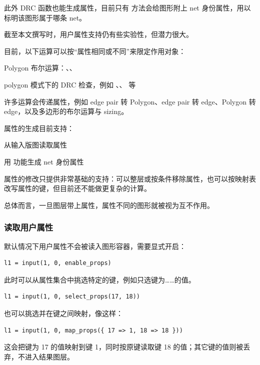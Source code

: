 此外 DRC 函数也能生成属性，目前只有  方法会给图形附上 net 身份属性，用以标明该图形属于哪条 net。

截至本文撰写时，用户属性支持仍有些实验性，但潜力很大。

目前，以下运算可以按“属性相同或不同”来限定作用对象：

\begin{kldesc}
\item Polygon 布尔运算：、、
\item polygon 模式下的 DRC 检查，例如 、、 等
\end{kldesc}

许多运算会传递属性，例如 edge pair 转 Polygon、edge pair 转 edge、Polygon 转 edge，以及多边形的布尔运算与 sizing。

属性的生成目前支持：

\begin{kldesc}
\item 从输入版图读取属性
\item 用  功能生成 net 身份属性
\end{kldesc}

属性的修改只提供非常基础的支持：可以整层或按条件移除属性，也可以按映射表改写属性的键，但目前还不能做更复杂的计算。

总体而言，一旦图层带上属性，属性不同的图形就被视为互不作用。

\subsubsection{读取用户属性}

默认情况下用户属性不会被读入图形容器，需要显式开启：

\begin{lstlisting}
l1 = input(1, 0, enable_props)
\end{lstlisting}

此时可以从属性集合中挑选特定的键，例如只选键为……的值。

\begin{lstlisting}
l1 = input(1, 0, select_props(17, 18))
\end{lstlisting}

也可以挑选并在键之间映射，像这样：

\begin{lstlisting}
l1 = input(1, 0, map_props({ 17 => 1, 18 => 18 }))
\end{lstlisting}

这会把键为 17 的值映射到键 1，同时按原键读取键 18 的值；其它键的值则被丢弃，不进入结果图层。

